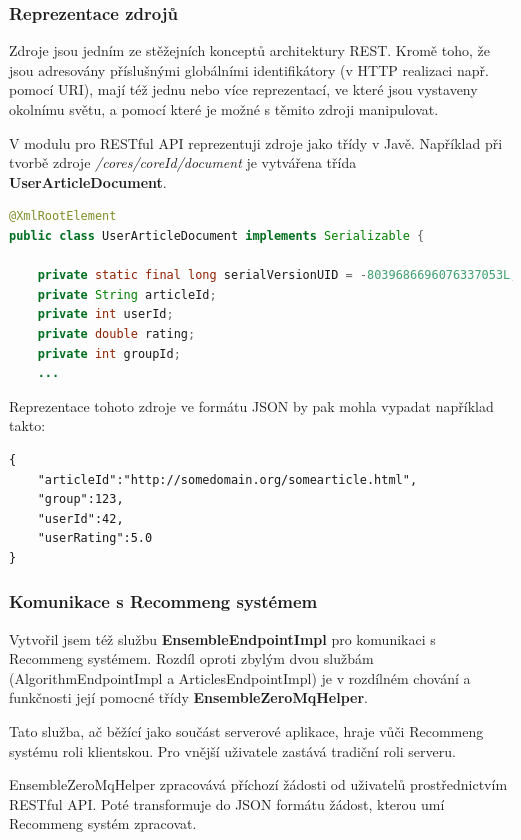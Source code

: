 \documentclass[thesis=M,czech]{FITthesis}[2014/05/07]
\begin{document}
\subsubsection{Reprezentace zdrojů}
\label{subsub:resource}
Zdroje jsou jedním ze stěžejních konceptů architektury REST. Kromě toho, že jsou adresovány příslušnými globálními identifikátory (v HTTP realizaci např. pomocí URI), mají též jednu nebo více reprezentací, ve které jsou vystaveny okolnímu světu, a pomocí které je možné s těmito zdroji manipulovat. 

V modulu pro RESTful API reprezentuji zdroje jako třídy v Javě. Například při tvorbě zdroje \emph{/cores/{coreId}/document} je vytvářena třída \textbf{UserArticleDocument}. 

\begin{lstlisting}[language=java]
@XmlRootElement
public class UserArticleDocument implements Serializable {       
    
    private static final long serialVersionUID = -8039686696076337053L;    
    private String articleId;
    private int userId;    
    private double rating;
    private int groupId;
    ...
\end{lstlisting}

Reprezentace tohoto zdroje ve formátu JSON by pak mohla vypadat například takto:

\begin{lstlisting}
{
    "articleId":"http://somedomain.org/somearticle.html",
    "group":123,
    "userId":42,
    "userRating":5.0
}
\end{lstlisting}

\subsubsection{Komunikace s Recommeng systémem}
\label{sec:restrec}
Vytvořil jsem též službu \textbf{EnsembleEndpointImpl} pro komunikaci s Recommeng systémem. Rozdíl oproti zbylým dvou službám (AlgorithmEndpointImpl a ArticlesEndpointImpl) je v rozdílném chování a funkčnosti její pomocné třídy \textbf{EnsembleZeroMqHelper}.

Tato služba, ač běžící jako součást serverové aplikace, hraje vůči Recommeng systému roli klientskou. Pro vnější uživatele zastává tradiční roli serveru.

EnsembleZeroMqHelper zpracovává příchozí žádosti od uživatelů prostřednictvím RESTful API. Poté transformuje do JSON formátu žádost, kterou umí Recommeng systém zpracovat. 
\end{document}
